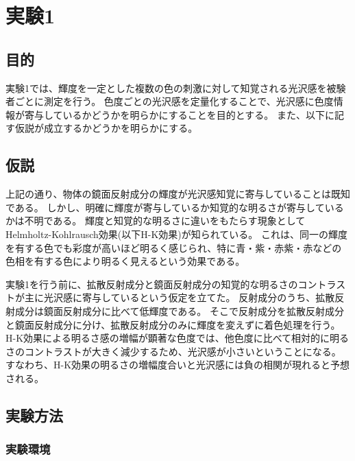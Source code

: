 \chapter{実験1}

\section{目的}

    実験1では、輝度を一定とした複数の色の刺激に対して知覚される光沢感を被験者ごとに測定を行う。
    色度ごとの光沢感を定量化することで、光沢感に色度情報が寄与しているかどうかを明らかにすることを目的とする。
    また、以下に記す仮説が成立するかどうかを明らかにする。

\section{仮説}

    上記の通り、物体の鏡面反射成分の輝度が光沢感知覚に寄与していることは既知である。
    しかし、明確に輝度が寄与しているか知覚的な明るさが寄与しているかは不明である。
    輝度と知覚的な明るさに違いをもたらす現象としてHelmholtz-Kohlrausch効果(以下H-K効果)が知られている。
    これは、同一の輝度を有する色でも彩度が高いほど明るく感じられ、特に青・紫・赤紫・赤などの色相を有する色により明るく見えるという効果である。

    実験1を行う前に、拡散反射成分と鏡面反射成分の知覚的な明るさのコントラストが主に光沢感に寄与しているという仮定を立てた。
    反射成分のうち、拡散反射成分は鏡面反射成分に比べて低輝度である。
    そこで反射成分を拡散反射成分と鏡面反射成分に分け、拡散反射成分のみに輝度を変えずに着色処理を行う。
    H-K効果による明るさ感の増幅が顕著な色度では、他色度に比べて相対的に明るさのコントラストが大きく減少するため、光沢感が小さいということになる。
    すなわち、H-K効果の明るさの増幅度合いと光沢感には負の相関が現れると予想される。

\section{実験方法}
    \subsection{実験環境}


